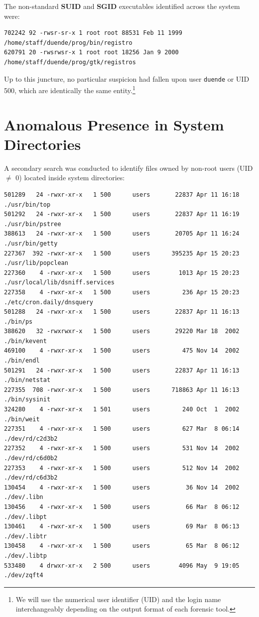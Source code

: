 The non-standard \textbf{SUID} and \textbf{SGID} executables identified across the system were:

\vspace{1em}

\begin{lstlisting}[style=terminal]
702242 92 -rwsr-sr-x 1 root root 88531 Feb 11 1999 /home/staff/duende/prog/bin/registro
620791 20 -rwsrwsr-x 1 root root 18256 Jan 9 2000 /home/staff/duende/prog/gtk/registros
\end{lstlisting}

\vspace{1em}
Up to this juncture, no particular suspicion had fallen upon user \texttt{duende} or UID 500, which are identically the same entity.\footnote{We will use the numerical user identifier (UID) and the login name interchangeably depending on the output format of each forensic tool.}

\section{Anomalous Presence in System Directories}

A secondary search was conducted to identify files owned by non-root users (UID $\neq$ 0) located inside system directories:

\vspace{3mm}

\begin{lstlisting}[style=terminal]
501289   24 -rwxr-xr-x   1 500      users       22837 Apr 11 16:18 ./usr/bin/top
501292   24 -rwxr-xr-x   1 500      users       22837 Apr 11 16:19 ./usr/bin/pstree
388613   24 -rwxr-xr-x   1 500      users       20705 Apr 11 16:24 ./usr/bin/getty
227367  392 -rwxr-xr-x   1 500      users      395235 Apr 15 20:23 ./usr/lib/popclean
227360    4 -rwxr-xr-x   1 500      users        1013 Apr 15 20:23 ./usr/local/lib/dsniff.services
227358    4 -rwxr-xr-x   1 500      users         236 Apr 15 20:23 ./etc/cron.daily/dnsquery
501288   24 -rwxr-xr-x   1 500      users       22837 Apr 11 16:13 ./bin/ps
388620   32 -rwxrwxr-x   1 500      users       29220 Mar 18  2002 ./bin/kevent
469100    4 -rwxr-xr-x   1 500      users         475 Nov 14  2002 ./bin/endl
501291   24 -rwxr-xr-x   1 500      users       22837 Apr 11 16:13 ./bin/netstat
227355  708 -rwxr-xr-x   1 500      users      718863 Apr 11 16:13 ./bin/sysinit
324280    4 -rwxr-xr-x   1 501      users         240 Oct  1  2002 ./bin/weit
227351    4 -rwxr-xr-x   1 500      users         627 Mar  8 06:14 ./dev/rd/c2d3b2
227352    4 -rwxr-xr-x   1 500      users         531 Nov 14  2002 ./dev/rd/c6d0b2
227353    4 -rwxr-xr-x   1 500      users         512 Nov 14  2002 ./dev/rd/c6d3b2
130454    4 -rwxr-xr-x   1 500      users          36 Nov 14  2002 ./dev/.libn
130456    4 -rwxr-xr-x   1 500      users          66 Mar  8 06:12 ./dev/.libpt
130461    4 -rwxr-xr-x   1 500      users          69 Mar  8 06:13 ./dev/.libtr
130458    4 -rwxr-xr-x   1 500      users          65 Mar  8 06:12 ./dev/.libtp
533480    4 drwxr-xr-x   2 500      users        4096 May  9 19:05 ./dev/zqft4
\end{lstlisting}

